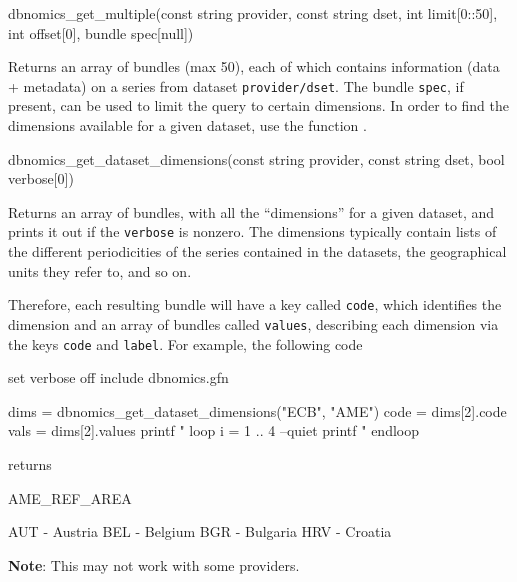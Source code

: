 \documentclass{article}
\begin{document}
\begin{funcdoc}{dbnomics\_get\_multiple(const string provider,
    const string dset,
    int limit[0::50], \\
    int offset[0],
    bundle spec[null])}
  
  Returns an array of bundles (max 50), each of which contains
  information (data + metadata) on a series from dataset
  \texttt{provider/dset}. The bundle \texttt{spec}, if present, can be
  used to limit the query to certain dimensions. In order to find the
  dimensions available for a given dataset, use the function
  .
  
  
\end{funcdoc}

\begin{funcdoc}{dbnomics\_get\_dataset\_dimensions(const string provider,
    const string dset, bool verbose[0])}

Returns an array of bundles, with all the ``dimensions'' for a given
dataset, and prints it out if the \texttt{verbose} is nonzero. The
dimensions typically contain lists of the different periodicities of
the series contained in the datasets, the geographical units they
refer to, and so on.

Therefore, each resulting bundle will have a key called \texttt{code},
which identifies the dimension and an array of bundles called
\texttt{values}, describing each dimension via the keys \texttt{code}
and \texttt{label}. For example, the following code
\begin{code}
set verbose off
include dbnomics.gfn

dims = dbnomics_get_dataset_dimensions("ECB", "AME")
code = dims[2].code
vals = dims[2].values
printf "%
loop i = 1 .. 4 --quiet
    printf "%
endloop
\end{code}

returns

\begin{code}
AME_REF_AREA

AUT - Austria
BEL - Belgium
BGR - Bulgaria
HRV - Croatia
\end{code}

\textbf{Note}: This may not work with some providers.

\end{funcdoc}
\end{document}

